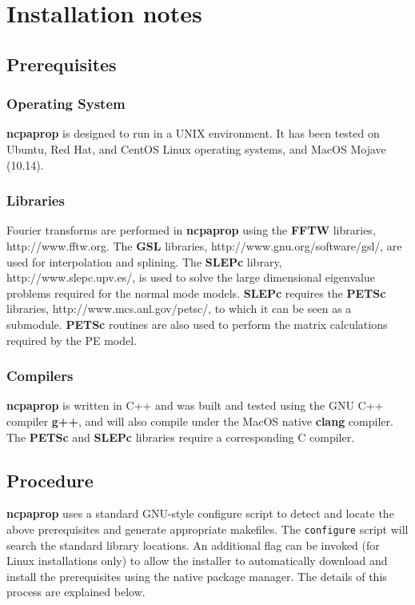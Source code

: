 \section{Installation notes}

\subsection{Prerequisites}

\subsubsection{Operating System}

\textbf{ncpaprop} is designed to run in a UNIX environment. It has been tested on Ubuntu, Red Hat, and CentOS Linux operating systems, and MacOS Mojave (10.14). 

\subsubsection{Libraries}

Fourier transforms are performed in \textbf{ncpaprop} using the \textbf{FFTW} libraries, http://www.fftw.org. The \textbf{GSL} libraries, http://www.gnu.org/software/gsl/, are used for interpolation and splining. The \textbf{SLEPc} library, http://www.slepc.upv.es/, is used to solve the large dimensional eigenvalue problems required for the normal mode models. \textbf{SLEPc} requires the \textbf{PETSc} libraries, http://www.mcs.anl.gov/petsc/, to which it can be seen as a submodule. \textbf{PETSc} routines are also used to perform the matrix calculations required by the PE model.

\subsubsection{Compilers}

\textbf{ncpaprop} is written in C++ and was built and tested using the GNU C++ compiler \textbf{g++}, and will also compile under the MacOS native \textbf{clang} compiler.  The \textbf{PETSc} and \textbf{SLEPc} libraries require a corresponding C compiler.

\subsection{Procedure}

\textbf{ncpaprop} uses a standard GNU-style configure script to detect and locate the above prerequisites and generate appropriate makefiles.  The \texttt{configure} script will search the standard library locations. An additional flag can be invoked (for Linux installations only) to allow the installer to automatically download and install the prerequisites using the native package manager. The details of this process are explained below.

